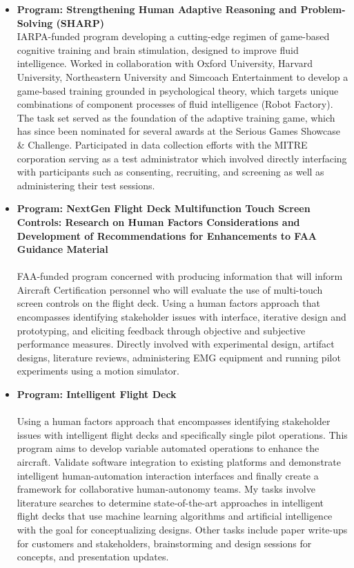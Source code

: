 \documentclass[]{cv-style}          %
\begin{document}
\begin{entrylist}
{ \begin{itemize}
  \item[]
  	{\textbf{Program: Strengthening Human Adaptive Reasoning and Problem-Solving (SHARP)}}
	{}\\
IARPA-funded program developing a cutting-edge regimen of game-based cognitive training and brain stimulation, designed to improve ﬂuid intelligence. Worked in collaboration with Oxford University, Harvard University, Northeastern University and Simcoach Entertainment to develop a game-based training grounded in psychological theory, which targets unique combinations of component processes of ﬂuid intelligence (Robot Factory). The task set served as the foundation of the adaptive training game, which has since been nominated for several awards at the Serious Games Showcase \& Challenge. Participated in data collection efforts with the MITRE corporation serving as a test administrator which involved directly interfacing with participants such as consenting, recruiting, and screening as well as administering their test sessions.
  \item[]
  	{\textbf{Program: NextGen Flight Deck Multifunction Touch Screen Controls: Research on Human Factors Considerations and Development of Recommendations for Enhancements to FAA Guidance Material}}\\
  {}\\
FAA-funded program concerned with producing information that will inform Aircraft Certification personnel who will evaluate the use of multi-touch screen controls on the flight deck. Using a human factors approach that encompasses identifying stakeholder issues with interface, iterative design and prototyping, and eliciting feedback through objective and subjective performance measures. Directly involved with experimental design, artifact designs, literature reviews, administering EMG equipment and running pilot experiments using a motion simulator.
\item[]
     {\textbf{Program: Intelligent Flight Deck}}\\
  {}\\
Using a human factors approach that encompasses identifying stakeholder issues with intelligent flight decks and specifically single pilot operations. This program aims to develop variable automated operations to enhance the aircraft. Validate software integration to existing platforms and demonstrate intelligent human-automation interaction interfaces and finally create a framework for collaborative human-autonomy teams. My tasks involve literature searches to determine state-of-the-art approaches in intelligent flight decks that use machine learning algorithms and artificial intelligence with the goal for conceptualizing designs. Other tasks include paper write-ups for customers and stakeholders, brainstorming and design sessions for concepts, and presentation updates. 

\end{itemize}}
\end{entrylist}
\end{document}
